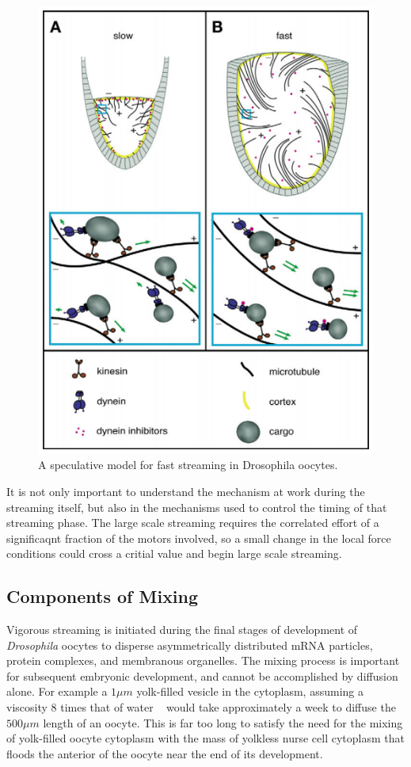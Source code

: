 \documentclass[11pt]{ucthesis}
\begin{document}
\begin{figure}[htp]
\begin{center}
\includegraphics[width=0.5\hsize]{biomodel.png}
\caption{ 
A speculative model for fast streaming in Drosophila oocytes.
}
\label{fig:spheres}
\end{center}
\end{figure}



It is not only important to understand the mechanism at work during the streaming itself, but also in the mechanisms used to control the timing of that streaming phase.
The large scale streaming requires the correlated effort of a significaqnt fraction of the motors involved, so a small change in the local force conditions could cross a critial value and begin large scale streaming.


\subsection{Components of Mixing}


Vigorous streaming is initiated during the final stages of
development of {\em Drosophila} oocytes to disperse asymmetrically
distributed mRNA particles, protein complexes, and membranous
organelles.  The mixing process is important for subsequent
embryonic development, and cannot be accomplished by
diffusion alone.  For example  a $ 1\mu m$ yolk-filled vesicle in
the cytoplasm, assuming a viscosity 8 times that of water ~\cite{LubyPhelps}
would take approximately a week to diffuse the $500 \mu m$  length
of an oocyte. This is far too long to satisfy the need for the mixing
of yolk-filled oocyte cytoplasm with the mass of yolkless nurse
cell cytoplasm that floods the anterior of the oocyte near the
end of its development.
\end{document}
